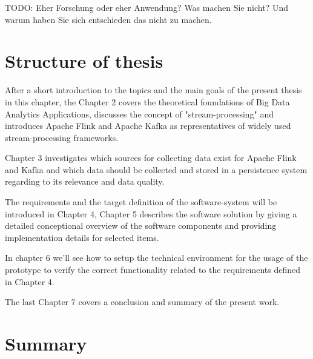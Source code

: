 TODO:
Eher Forschung oder eher Anwendung?
Was machen Sie nicht?  Und warum haben Sie sich entschieden das nicht zu machen.


\section{Structure of thesis}

After a short introduction to the topics and the main goals of the present thesis in this
chapter, the Chapter 2 covers the theoretical foundations of Big Data Analytics
Applications, discusses the concept of "stream-processing" and introduces Apache Flink
and Apache Kafka as representatives of widely used stream-processing frameworks.

Chapter 3 investigates which sources for collecting data exist for Apache Flink and Kafka
and which data should be collected and stored in a persistence system regarding to its
relevance and data quality.

The requirements and the target definition of the software-system will be introduced
in Chapter 4, Chapter 5 describes the software solution by giving a detailed conceptional
overview of the software components and providing implementation details for selected items.

In chapter 6 we'll see how to setup the technical environment for the usage of the
prototype to verify the correct functionality related to the requirements defined in
Chapter 4.

The last Chapter 7 covers a conclusion and summary of the present work.

\section{Summary}

